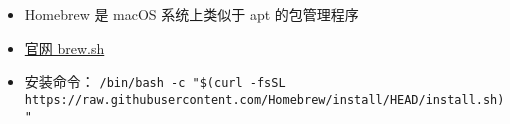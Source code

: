 
\begin{issues}
\issueDraft
\end{issues}

\begin{itemize}
\item Homebrew 是 macOS 系统上类似于 apt 的包管理程序
\item \href{https://brew.sh}{官网 brew.sh}
\item 安装命令： \verb|/bin/bash -c "$(curl -fsSL https://raw.githubusercontent.com/Homebrew/install/HEAD/install.sh)"|
\end{itemize}
